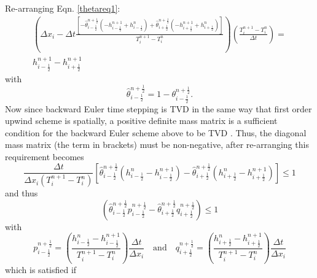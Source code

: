 Re-arranging Eqn. \ref{thetareq1}:
\begin{eqnarray}
\left( \Delta x_i - \Delta t \frac{\left[
-\widehat{\theta}_{i-\frac{1}{2}}^{n+\frac{1}{2}}(
-h_{i-\frac{1}{2}}^{n+1}+h_{i-\frac{1}{2}}^{n})
+\widehat{\theta}_{i+\frac{1}{2}}^{n+\frac{1}{2}}(
-h_{i+\frac{1}{2}}^{n+1}+h_{i+\frac{1}{2}}^{n}) \right]}
{T_i^{n+1}-T_i^n} \right)
\left(\frac{T_i^{n+1} - T_i^n}{\Delta t} \right) =\nonumber\\
h_{i-\frac{1}{2}}^{n+1}-h_{i+\frac{1}{2}}^{n+1}\nonumber
\end{eqnarray}
with
\begin{displaymath}
\widehat{\theta}_{i-\frac{1}{2}}^{n+\frac{1}{2}}  = 1-\theta_{i-\frac{1}{2}}^{n+\frac{1}{2}}.
\end{displaymath}
Now since backward Euler time stepping is TVD in the same way that first order upwind scheme is spatially, a positive definite mass matrix is a sufficient condition for the backward Euler scheme above to be TVD \citep[see][]{hirsch_1990}.  Thus, the diagonal mass matrix (the term in brackets) must be non-negative, after re-arranging this requirement becomes
\begin{displaymath}
\frac{\Delta t}{\Delta x_{i}\left(T_i^{n+1} - T_i^{n}\right)} \left[ \widehat{\theta}_{i-\frac{1}{2}}^{n+\frac{1}{2}}\left(h_{i-\frac{1}{2}}^{n} - h_{i-\frac{1}{2}}^{n+1}\right)-\hat\theta_{i+\frac{1}{2}}^{n+\frac{1}{2}}\left(h_{i+\frac{1}{2}}^{n}-h_{i+\frac{1}{2}}^{n+1}\right) \right] \leq 1
\end{displaymath}
and thus
\begin{displaymath}
\left(\widehat{\theta}_{i-\frac{1}{2}}^{n+\frac{1}{2}}
p_{i-\frac{1}{2}}^{n+\frac{1}{2}}
-\widehat{\theta}_{i+\frac{1}{2}}^{n+\frac{1}{2}}
q_{i+\frac{1}{2}}^{n+\frac{1}{2}} \right) \leq 1
\end{displaymath}
with
\begin{displaymath}
p_{i-\frac{1}{2}}^{n+\frac{1}{2}} = \left( \frac{h_{i-\frac{1}{2}}^{n}
- h_{i-\frac{1}{2}}^{n+1}}{T^{n+1}_{i} - T_{i}^{n}} \right)
\frac{\Delta t}{\Delta x_{i}}  \quad \text{and} \quad
q_{i+\frac{1}{2}}^{n+\frac{1}{2}} = \left(
\frac{h_{i+\frac{1}{2}}^n-h_{i+\frac{1}{2}}^{n+1}}{T^{n+1}_{i} - T_{i}^{n}}
\right) \frac{\Delta t}{\Delta x_{i}}
\end{displaymath}
which is satisfied if
